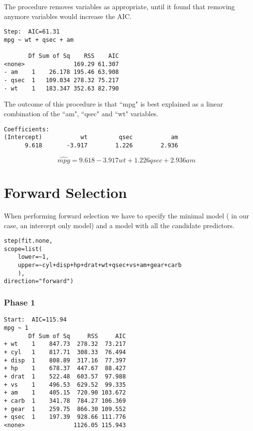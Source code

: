 The procedure removes variables as appropriate, until it found that removing anymore variables would increase the AIC.
\footnotesize \begin{verbatim}
Step:  AIC=61.31
mpg ~ wt + qsec + am

       Df Sum of Sq    RSS    AIC
<none>              169.29 61.307
- am    1    26.178 195.46 63.908
- qsec  1   109.034 278.32 75.217
- wt    1   183.347 352.63 82.790
\end{verbatim}\normalsize

The outcome of this procedure is that ``mpg" is best explained as a linear combination of the ``am", ``qsec" and ``wt" variables.

\begin{verbatim}
Coefficients:
(Intercept)           wt         qsec           am
      9.618       -3.917        1.226        2.936
\end{verbatim}\normalsize

\[
\hat{mpg} = 9.618 - 3.917wt + 1.226qsec + 2.936am
\]

\newpage
\section{Forward Selection}

When performing forward selection we have to specify the minimal model ( in our case, an intercept only model)
and a model with all the candidate predictors.
\footnotesize
\begin{verbatim}
step(fit.none,
scope=list(
	lower=~1,
	upper=~cyl+disp+hp+drat+wt+qsec+vs+am+gear+carb
	),
direction="forward")
\end{verbatim}
\normalsize
\subsubsection{Phase 1}
\footnotesize
\begin{verbatim}
Start:  AIC=115.94
mpg ~ 1
       Df Sum of Sq     RSS     AIC
+ wt    1    847.73  278.32  73.217
+ cyl   1    817.71  308.33  76.494
+ disp  1    808.89  317.16  77.397
+ hp    1    678.37  447.67  88.427
+ drat  1    522.48  603.57  97.988
+ vs    1    496.53  629.52  99.335
+ am    1    405.15  720.90 103.672
+ carb  1    341.78  784.27 106.369
+ gear  1    259.75  866.30 109.552
+ qsec  1    197.39  928.66 111.776
<none>              1126.05 115.943
\end{verbatim}
\normalsize

